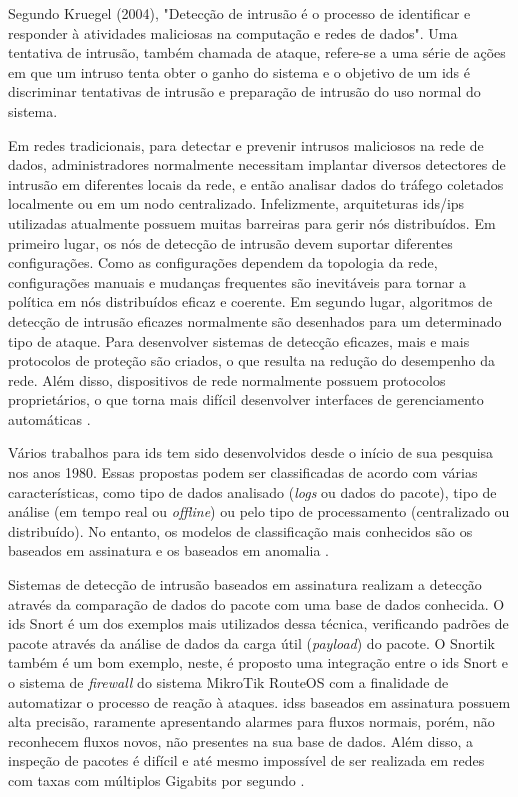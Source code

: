 Segundo Kruegel (2004)\nocite{Kruegel:2004}, "Detecção de intrusão é o processo de identificar e responder à atividades maliciosas na computação e redes de dados". Uma tentativa de intrusão, também chamada de ataque, refere-se a uma série de ações em que um intruso tenta obter o ganho do sistema e o objetivo de um \gls{ids} é discriminar tentativas de intrusão e preparação de intrusão do uso normal do sistema.

Em redes tradicionais, para detectar e prevenir intrusos maliciosos na rede de dados, administradores normalmente necessitam implantar diversos detectores de intrusão em diferentes locais da rede, e então analisar dados do tráfego coletados localmente ou em um nodo centralizado. Infelizmente, arquiteturas \gls{ids}/\gls{ips} utilizadas atualmente possuem muitas barreiras para gerir nós distribuídos. Em primeiro lugar, os nós de detecção de intrusão devem suportar diferentes configurações. Como as configurações dependem da topologia da rede, configurações manuais e mudanças frequentes são inevitáveis para tornar a política em nós distribuídos eficaz e coerente. Em segundo lugar, algoritmos de detecção de intrusão eficazes normalmente são desenhados para um determinado tipo de ataque. Para desenvolver sistemas de detecção eficazes, mais e mais protocolos de proteção são criados, o que resulta na redução do desempenho da rede. Além disso, dispositivos de rede normalmente possuem protocolos proprietários, o que torna mais difícil desenvolver interfaces de gerenciamento automáticas \cite{Wang:2015}.

Vários trabalhos para \gls{ids} tem sido desenvolvidos desde o início de sua pesquisa nos anos 1980. Essas propostas podem ser classificadas de acordo com várias características, como tipo de dados analisado (\textit{logs} ou dados do pacote), tipo de análise (em tempo real ou \textit{offline}) ou pelo tipo de processamento (centralizado ou distribuído). No entanto, os modelos de classificação mais conhecidos são os baseados em assinatura e os baseados em anomalia \cite{Axelsson:2000}.

Sistemas de detecção de intrusão baseados em assinatura realizam a detecção através da comparação de dados do pacote com uma base de dados conhecida. O \gls{ids} Snort \cite{Roesch:1999} é um dos exemplos mais utilizados dessa técnica, verificando padrões de pacote através da análise de dados da carga útil (\textit{payload}) do pacote. O Snortik \cite{Fagundes16} também é um bom exemplo, neste, é proposto uma integração entre o \gls{ids} Snort e o sistema de \textit{firewall} do sistema MikroTik RouteOS \cite{mikrotik16} com a finalidade de automatizar o processo de reação à ataques. \glspl{ids} baseados em assinatura possuem alta precisão, raramente apresentando alarmes para fluxos normais, porém, não reconhecem fluxos novos, não presentes na sua base de dados. Além disso, a inspeção de pacotes é difícil e até mesmo impossível de ser realizada  em redes com taxas com múltiplos Gigabits por segundo \cite{Lai:2004, Gao:2006}.


